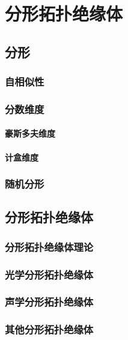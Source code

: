 \chapter{分形拓扑绝缘体}
\section{分形}
\subsection{自相似性}
\subsection{分数维度}
\subsubsection{豪斯多夫维度}
\subsubsection{计盒维度}
\subsection{随机分形}
\section{分形拓扑绝缘体}
\subsection{分形拓扑绝缘体理论}
\subsection{光学分形拓扑绝缘体}
\subsection{声学分形拓扑绝缘体}
\subsection{其他分形拓扑绝缘体}